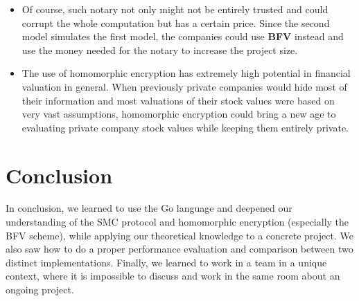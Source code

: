 \documentclass[10pt,conference,compsocconf]{IEEEtran}
\begin{document}
\begin{itemize}
    \item Of course, such notary not only might not be entirely trusted and could corrupt the whole computation but has a certain price. Since the second model simulates the first model, the companies could use \textbf{BFV} instead and use the money needed for the notary to increase the project size. \\
    
    \item The use of homomorphic encryption has extremely high potential in financial valuation in general. When previously private companies would hide most of their information and most valuations of their stock values were based on very vast assumptions, homomorphic encryption could bring a new age to evaluating private company stock values while keeping them entirely private. 
\end{itemize}

\section{Conclusion}
\begin{itemize}
    In conclusion, we learned to use the Go language and deepened our understanding of the SMC protocol and homomorphic encryption (especially the BFV scheme), while applying our theoretical knowledge to a concrete project. We also saw how to do a proper performance evaluation and comparison between two distinct implementations. Finally, we learned to work in a team in a unique context, where it is impossible to discuss and work in the same room about an ongoing project.
\end{itemize}



\end{document}
